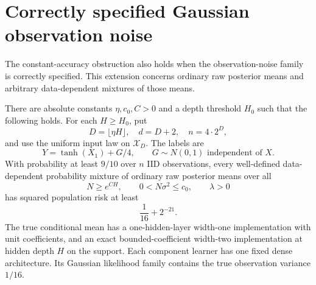 \section{Correctly specified Gaussian observation noise}
\label{sec:gaussian-fixed-accuracy}
The constant-accuracy obstruction also holds when the observation-noise family is correctly specified. This extension concerns ordinary raw posterior means and arbitrary data-dependent mixtures of those means.

\begin{theorem}
\label{thm:gaussian-fixed-accuracy}
There are absolute constants $\eta,c_0,C>0$ and a depth threshold $H_0$ such that the following holds. For each $H\ge H_0$, put
\[
 D=\lfloor\eta H\rfloor,\quad d=D+2,\quad n=4\cdot2^D,
\]
and use the uniform input law on $\mathcal X_D$. The labels are
\[
 Y=\tanh(X_1)+G/4,\qquad G\sim N(0,1)\text{ independent of }X.
\]
With probability at least $9/10$ over $n$ IID observations, every well-defined data-dependent probability mixture of ordinary raw posterior means over all
\[
 N\ge e^{CH},\qquad 0<N\sigma^2\le c_0,\qquad \lambda>0
\]
has squared population risk at least
\[
 \frac1{16}+2^{-21}.
\]
The true conditional mean has a one-hidden-layer width-one implementation with unit coefficients, and an exact bounded-coefficient width-two implementation at hidden depth $H$ on the support. Each component learner has one fixed dense architecture. Its Gaussian likelihood family contains the true observation variance $1/16$.
\end{theorem}
